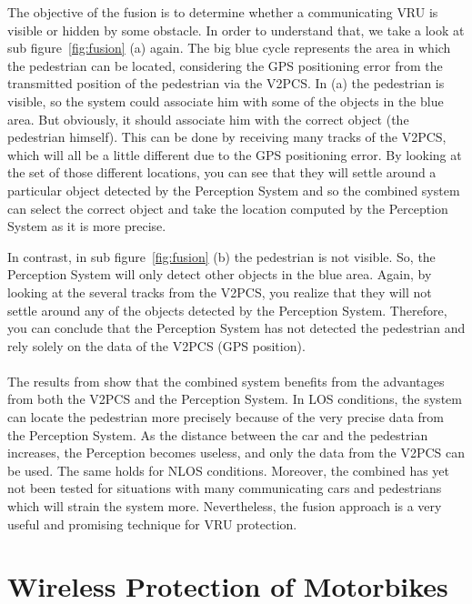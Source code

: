 \documentclass[]{ccs-thesis}
\begin{document}
The objective of the fusion is to determine whether a communicating \ac{VRU} is visible or hidden by some obstacle. In order to understand that, we take a look at sub figure~\ref{fig:fusion} (a) again. The big blue cycle represents the area in which the pedestrian can be located, considering the GPS positioning error from the transmitted position of the pedestrian via the \ac{V2PCS}. In (a) the pedestrian is visible, so the system could associate him with some of the objects in the blue area. But obviously, it should associate him with the correct object (the pedestrian himself). This can be done by receiving many tracks of the \ac{V2PCS}, which will all be a little different due to the GPS positioning error. By looking at the set of those different locations, you can see that they will settle around a particular object detected by the Perception System and so the combined system can select the correct object and take the location computed by the Perception System as it is more precise.

In contrast, in sub figure~\ref{fig:fusion} (b) the pedestrian is not visible. So, the Perception System will only detect other objects in the blue area. Again, by looking at the several tracks from the \ac{V2PCS}, you realize that they will not settle around any of the objects detected by the Perception System. Therefore, you can conclude that the Perception System has not detected the pedestrian and rely solely on the data of the \ac{V2PCS} (GPS position).
\\\\
The results from \cite{2016fusion} show that the combined system benefits from the advantages from both the \ac{V2PCS} and the Perception System. In \ac{LOS} conditions, the system can locate the pedestrian more precisely because of the very precise data from the Perception System. As the distance between the car and the pedestrian increases, the Perception becomes useless, and only the data from the \ac{V2PCS} can be used. The same holds for \ac{NLOS} conditions. Moreover, the combined has yet not been tested for situations with many communicating cars and pedestrians which will strain the system more. Nevertheless, the fusion approach is a very useful and promising technique for \ac{VRU} protection.

\section{Wireless Protection of Motorbikes}\label{sec:motorbikes}
\end{document}
